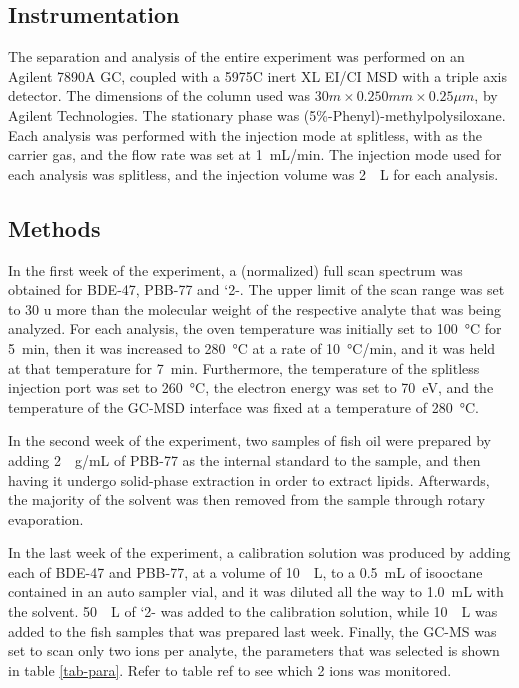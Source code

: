 \documentclass[a4paper, 12pt]{article}
\begin{document}
\subsection{Instrumentation}
The separation and analysis of the entire experiment was performed on an Agilent 7890A GC, coupled with a 5975C inert XL EI/CI MSD with a triple axis detector. The dimensions of the column used was $30m \times 0.250mm \times 0.25\mu{}m$, by Agilent Technologies. The stationary phase was (5\%-Phenyl)-methylpolysiloxane. Each analysis was performed with the injection mode at splitless, with  as the carrier gas, and the flow rate was set at \SI{1}{mL/min}. The injection mode used for each analysis was splitless, and the injection volume was \SI{2}{\mu{}L} for each analysis.

\subsection{Methods}
In the first week of the experiment, a (normalized) full scan spectrum was obtained for BDE-47, PBB-77 and `2-. The upper limit of the scan range was set to 30 \si{\amu} more than the molecular weight of the respective analyte that was being analyzed. For each analysis, the oven temperature was initially set to \SI{100}{\degreeCelsius} for \SI{5}{min}, then it was increased to \SI{280}{\degreeCelsius} at a rate of \SI{10}{\degreeCelsius/min}, and it was held at that temperature for \SI{7}{min}. Furthermore, the temperature of the splitless injection port was set to \SI{260}{\degreeCelsius}, the electron energy was set to \SI{70}{eV}, and the temperature of the GC-MSD interface was fixed at a temperature of \SI{280}{\degreeCelsius}.

In the second week of the experiment, two samples of fish oil were prepared by adding \SI{2}{\mu{}g/mL} of PBB-77 as the internal standard to the sample, and then having it undergo solid-phase extraction in order to extract lipids. Afterwards, the majority of the solvent was then removed from the sample through rotary evaporation.

In the last week of the experiment, a calibration solution was produced by adding each of BDE-47 and PBB-77, at a volume of \SI{10}{\mu{}L}, to a \SI{0.5}{mL} of isooctane contained in an auto sampler vial, and it was diluted all the way to \SI{1.0}{mL} with the solvent. \SI{50}{\mu{}L} of `2- was added to the calibration solution, while \SI{10}{\mu{}L} was added to the fish samples that was prepared last week. Finally, the GC-MS was set to scan only two ions per analyte, the parameters that was selected is shown in table \ref{tab-para}. Refer to table ref to see which 2 ions was monitored.
\end{document}
